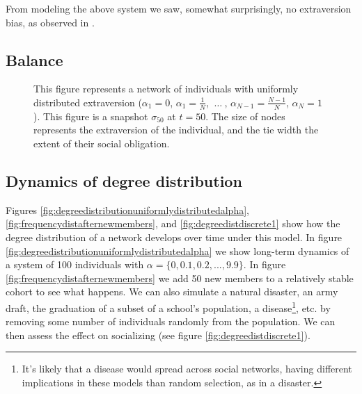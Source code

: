 \documentclass[]{article}
\begin{document}
	From modeling the above system we saw, somewhat surprisingly, no extraversion bias, as observed in \cite{Feiler2014}.
	
	\subsection{Balance}
	
	\begin{figure}
		\centering
		\caption{This figure represents a network of individuals with uniformly distributed extraversion ($\alpha_1 = 0$, $\alpha_1 = \frac{1}{N}$, $~\dots~$, $ \alpha_{N-1} = \frac{N-1}{N}$, $ \alpha_N = 1$). This figure is a snapshot $\sigma_{50}$ at $t=50$. The size of nodes represents the extraversion of the individual, and the tie width the extent of their social obligation.}
		\label{fig:screenshot194416}
	\end{figure}

	\subsection{Dynamics of degree distribution}
		Figures \ref{fig:degreedistributionuniformlydistributedalpha}, \ref{fig:frequencydistafternewmembers}, and \ref{fig:degreedistdiscrete1} show how the degree distribution of a network develops over time under this model. In figure \ref{fig:degreedistributionuniformlydistributedalpha} we show long-term dynamics of a system of 100 individuals with $\alpha = \{0, 0.1, 0.2, ..., 9.9\}$. In figure \ref{fig:frequencydistafternewmembers} we add 50 new members to a relatively stable cohort to see what happens.
	We can also simulate a natural disaster, an army draft, the graduation of a subset of a school's population, a disease\footnote{It's likely that a disease would spread across social networks, having different implications in these models than random selection, as in a disaster.}, etc. by removing some number of individuals randomly from the population. We can then assess the effect on socializing (see figure \ref{fig:degreedistdiscrete1}).
	
\end{document}
